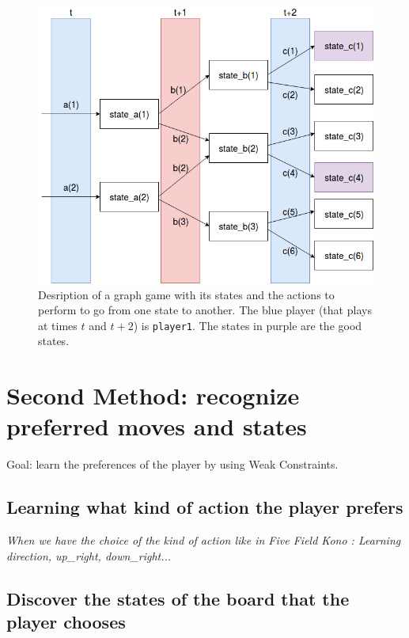 \documentclass[12pt,twoside]{report}
\begin{document}
\begin{figure}[h]
\centering
\includegraphics[width = 0.8\hsize]{figures/graph_game.png}
\caption{Desription of a graph game with its states and the actions to perform to go from one state to another. The blue player (that plays at times $t$ and $t+2$) is \texttt{player1}. The states in purple are the good states.}
\label{fig:graph_game}
\end{figure}

\section{Second Method: recognize preferred moves and states}

Goal: learn the preferences of the player by using Weak Constraints.

\subsection{Learning what kind of action the player prefers}

\emph{When we have the choice of the kind of action like in Five Field Kono : Learning  direction, up\_right, down\_right... }


\subsection{Discover the states of the board that the player chooses}

\end{document}
